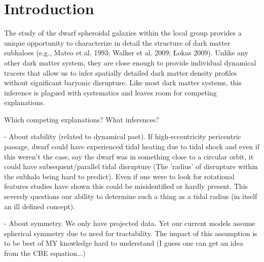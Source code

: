 \documentclass[%
 aip,
 twocolumn,
 jmp,%
 amsmath,amssymb,
 reprint,%
]{aastex61}
\begin{document}



\section{\label{sec:level1}}

\section{Introduction}

The study of the dwarf spheroidal galaxies within the local group provides a unique opportunity to characterize in detail the structure of dark matter subhaloes (e.g., Mateo et al. 1993; Walker et al. 2009; Łokas 2009). Unlike any other dark matter system, they are close enough to provide individual dynamical tracers that allow us to infer spatially detailed dark matter density profiles without significant baryonic disrupture. Like most dark matter systems, this inference is plagued with systematics and leaves room for competing explanations.



Which competing explanations?
What inferences?

- About stability (related to dynamical past). If high-eccentricity pericentric passage, dwarf could have experienced tidal heating due to tidal shock and even if this weren't the case, say the dwarf was in something close to a circular orbit, it could have subsequent/parallel tidal disrupture (The 'radius' of disrupture within the subhalo being hard to predict). Even if one were to look for rotational features studies have shown this could be misidentified or hardly present. This severely questions our ability to determine such a thing as a tidal radius (in itself an ill defined concept).

- About symmetry. We only have projected data. Yet our current models assume spherical symmetry due to need for tractability. The impact of this assumption is to be best of MY knowledge hard to understand (I guess one can get an idea from the CBE equation...)
\end{document}
